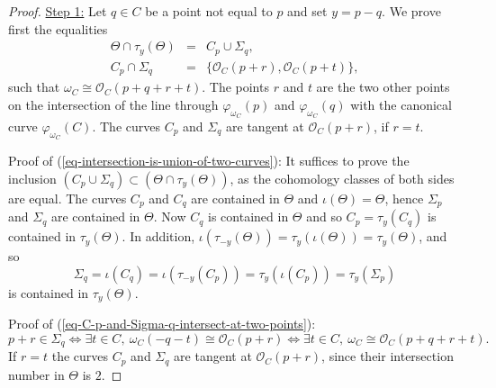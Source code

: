 \documentclass[10pt,a4paper]{amsart}
\newcommand{\StructureSheaf}[1]{{\mathcal O}_{#1}}
\begin{document}
\begin{proof}
\underline{Step 1:}
Let $q\in C$ be a point not equal to $p$ and set $y=p-q$. We prove first the equalities
\begin{eqnarray}
\label{eq-intersection-is-union-of-two-curves}
\Theta\cap \tau_y(\Theta)&=&C_p\cup \Sigma_q,
\\
\label{eq-C-p-and-Sigma-q-intersect-at-two-points}
C_p\cap\Sigma_q&=&\{\StructureSheaf{C}(p+r),\StructureSheaf{C}(p+t)\},
\end{eqnarray}
such that $\omega_C\cong\StructureSheaf{C}(p+q+r+t)$. The points $r$ and $t$ are the two other points on the intersection of the line through $\varphi_{\omega_C}(p)$ and $\varphi_{\omega_C}(q)$ with the canonical curve $\varphi_{\omega_C}(C)$. The curves $C_p$ and $\Sigma_q$ are tangent at $\StructureSheaf{C}(p+r)$, if $r=t$. 

Proof of (\ref{eq-intersection-is-union-of-two-curves}):
It suffices to prove the inclusion $(C_p\cup \Sigma_q)\subset (\Theta\cap \tau_y(\Theta))$, as the cohomology classes of both sides are equal. 
The curves $C_p$ and $C_q$ are contained in $\Theta$ and  $\iota(\Theta)=\Theta$, hence $\Sigma_p$ and $\Sigma_q$ are  contained in $\Theta$.
Now $C_q$ is contained in $\Theta$ and so $C_p=\tau_y(C_q)$ is contained in $\tau_y(\Theta)$. 
In addition, $\iota(\tau_{-y}(\Theta))=\tau_y(\iota(\Theta))=\tau_y(\Theta)$, and so 
\begin{equation}
\label{eq-Sigma-q-is-translate-of-Sigma-p-by-p-q}
\Sigma_q=\iota(C_q)=\iota(\tau_{-y}(C_p))=\tau_y(\iota(C_p))=\tau_y(\Sigma_p)
\end{equation}
is contained in  $\tau_y(\Theta).$

Proof of (\ref{eq-C-p-and-Sigma-q-intersect-at-two-points}):
\[
p+r\in\Sigma_q\Leftrightarrow \exists t\in C, \ \omega_C(-q-t)\cong\StructureSheaf{C}(p+r)
\Leftrightarrow 
\exists t\in C, \  \omega_C\cong\StructureSheaf{C}(p+q+r+t).
\]
If $r=t$ the curves $C_p$ and $\Sigma_q$ are tangent at $\StructureSheaf{C}(p+r)$, since their intersection number in $\Theta$ is $2$.


\end{proof}
\end{document}
